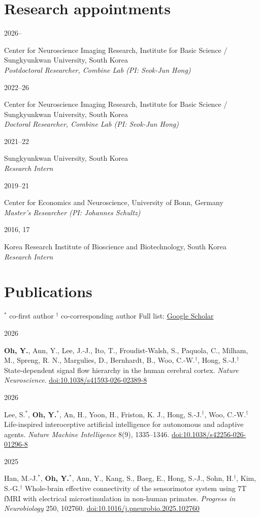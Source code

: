 \documentclass[11pt]{article}
\newcommand{\dated}[2]{%
  \begin{minipage}[t]{0.10\textwidth}\small #1\end{minipage}%
  \begin{minipage}[t]{0.89\textwidth}#2\end{minipage}\par\smallskip}
\newcommand{\role}[1]{\\\textit{#1}}
\newcommand{\me}[1]{\textbf{#1}}
\begin{document}
\section{Research appointments}
\dated{2026--}{Center for Neuroscience Imaging Research, Institute for Basic Science / Sungkyunkwan University, South Korea
\role{Postdoctoral Researcher, Combine Lab (PI: Seok-Jun Hong)}}
\dated{2022--26}{Center for Neuroscience Imaging Research, Institute for Basic Science / Sungkyunkwan University, South Korea
\role{Doctoral Researcher, Combine Lab (PI: Seok-Jun Hong)}}
\dated{2021--22}{Sungkyunkwan University, South Korea
\role{Research Intern}}
\dated{2019--21}{Center for Economics and Neuroscience, University of Bonn, Germany
\role{Master's Researcher (PI: Johannes Schultz)}}
\dated{2016, 17}{Korea Research Institute of Bioscience and Biotechnology, South Korea
\role{Research Intern}}

\section{Publications}
{\footnotesize $^*$ co-first author \quad $^\dagger$ co-corresponding author \quad Full list:
\href{https://scholar.google.com/citations?user=I0_2hEUAAAAJ}{Google Scholar}}
\smallskip

\dated{2026}{\me{Oh, Y.}, Ann, Y., Lee, J.-J., Ito, T., Froudist-Walsh, S., Paquola, C., Milham, M.,
Spreng, R. N., Margulies, D., Bernhardt, B., Woo, C.-W.$^\dagger$, Hong, S.-J.$^\dagger$
State-dependent signal flow hierarchy in the human cerebral cortex.
\textit{Nature Neuroscience}.
\href{https://doi.org/10.1038/s41593-026-02389-8}{doi:10.1038/s41593-026-02389-8}}

\dated{2026}{Lee, S.$^*$, \me{Oh, Y.}$^*$, An, H., Yoon, H., Friston, K. J., Hong, S.-J.$^\dagger$, Woo, C.-W.$^\dagger$
Life-inspired interoceptive artificial intelligence for autonomous and adaptive agents.
\textit{Nature Machine Intelligence} 8(9), 1335--1346.
\href{https://doi.org/10.1038/s42256-026-01296-8}{doi:10.1038/s42256-026-01296-8}}

\dated{2025}{Han, M.-J.$^*$, \me{Oh, Y.}$^*$, Ann, Y., Kang, S., Baeg, E., Hong, S.-J., Sohn, H.$^\dagger$, Kim, S.-G.$^\dagger$
Whole-brain effective connectivity of the sensorimotor system using 7T fMRI with electrical
microstimulation in non-human primates. \textit{Progress in Neurobiology} 250, 102760.
\href{https://doi.org/10.1016/j.pneurobio.2025.102760}{doi:10.1016/j.pneurobio.2025.102760}}
\end{document}
